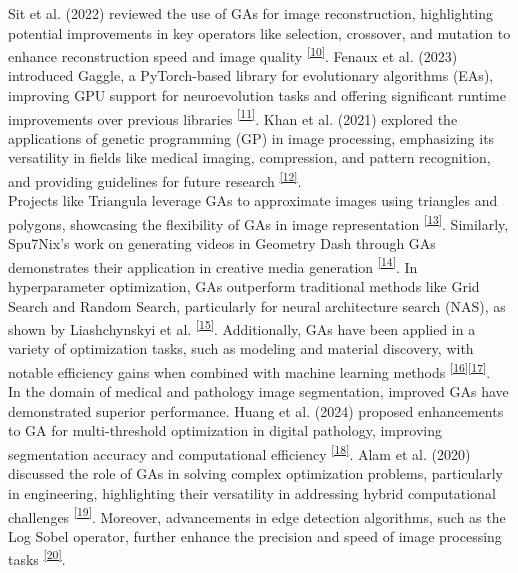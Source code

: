 \documentclass[10pt, conference]{IEEEtran}
\begin{document}
Sit et al. (2022) reviewed the use of GAs for image reconstruction, highlighting potential improvements in key operators like selection, crossover, and mutation to enhance reconstruction speed and image quality \hypertarget{ref}{\textsuperscript{\hyperref[sec:10r]{[10]}\label{sec:10}}}. Fenaux et al. (2023) introduced Gaggle, a PyTorch-based library for evolutionary algorithms (EAs), improving GPU support for neuroevolution tasks and offering significant runtime improvements over previous libraries \hypertarget{ref}{\textsuperscript{\hyperref[sec:11r]{[11]}\label{sec:11}}}. Khan et al. (2021) explored the applications of genetic programming (GP) in image processing, emphasizing its versatility in fields like medical imaging, compression, and pattern recognition, and providing guidelines for future research \hypertarget{ref}{\textsuperscript{\hyperref[sec:12r]{[12]}\label{sec:12}}}. \\

Projects like Triangula leverage GAs to approximate images using triangles and polygons, showcasing the flexibility of GAs in image representation \hypertarget{ref}{\textsuperscript{\hyperref[sec:13r]{[13]}\label{sec:13}}}. Similarly, Spu7Nix's work on generating videos in Geometry Dash through GAs demonstrates their application in creative media generation \hypertarget{ref}{\textsuperscript{\hyperref[sec:14r]{[14]}\label{sec:14}}}. In hyperparameter optimization, GAs outperform traditional methods like Grid Search and Random Search, particularly for neural architecture search (NAS), as shown by Liashchynskyi et al. \hypertarget{ref}{\textsuperscript{\hyperref[sec:15r]{[15]}\label{sec:15}}}. Additionally, GAs have been applied in a variety of optimization tasks, such as modeling and material discovery, with notable efficiency gains when combined with machine learning methods \hypertarget{ref}{\textsuperscript{\hyperref[sec:16r]{[16]}\label{sec:16}}}\hypertarget{ref}{\textsuperscript{\hyperref[sec:17r]{[17]}\label{sec:17}}}. \\

In the domain of medical and pathology image segmentation, improved GAs have demonstrated superior performance. Huang et al. (2024) proposed enhancements to GA for multi-threshold optimization in digital pathology, improving segmentation accuracy and computational efficiency \hypertarget{ref}{\textsuperscript{\hyperref[sec:18r]{[18]}\label{sec:18}}}. Alam et al. (2020) discussed the role of GAs in solving complex optimization problems, particularly in engineering, highlighting their versatility in addressing hybrid computational challenges \hypertarget{ref}{\textsuperscript{\hyperref[sec:19r]{[19]}\label{sec:19}}}. Moreover, advancements in edge detection algorithms, such as the Log Sobel operator, further enhance the precision and speed of image processing tasks \hypertarget{ref}{\textsuperscript{\hyperref[sec:20r]{[20]}\label{sec:20}}}. \\
\end{document}
